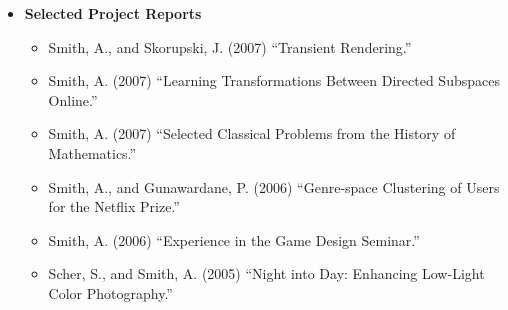 \documentclass[10pt]{article}
\begin{document}
\begin{itemize}
\item  
  \textbf{Selected Project Reports}
    \begin{itemize}
       \item Smith, A., and Skorupski, J. (2007) ``Transient Rendering.''
       \item Smith, A. (2007) ``Learning Transformations Between Directed Subspaces Online.''
       \item Smith, A. (2007) ``Selected Classical Problems from the History of Mathematics.''
       \item Smith, A., and Gunawardane, P. (2006) ``Genre-space Clustering of Users for the Netflix Prize.''
       \item Smith, A. (2006) ``Experience in the Game Design Seminar.''
       \item Scher, S., and Smith, A. (2005) ``Night into Day: Enhancing Low-Light Color Photography.''
  \end{itemize}
    
\end{itemize} %
\end{document}

